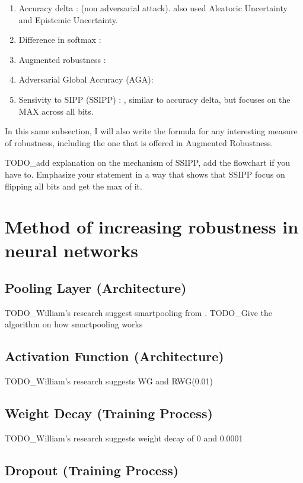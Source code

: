 \documentclass[ %
                    author={Revalda Putawara},
                supervisor={Dr. James Pope},
                    degree={MSc},
                     title={Robustness of Bayesian Neural Networks Design Choices Against Weight and Bias Perturbation Induced by Single Event Upsets (SEUs)},
                      type={},
                      year={2025}]{dissertation}
\begin{document}
\begin{enumerate}
\item Accuracy delta : \cite{dennispoperobustcnn} (non adversarial attack). \cite{zhang2021a} also used Aleatoric Uncertainty and Epistemic Uncertainty.
\item Difference in softmax : \cite{carbone2020a}
\item Augmented robustness : \cite{essbai2024a}
\item Adversarial Global Accuracy (AGA): \cite{Blaas2021}
\item Sensivity to SIPP (SSIPP) : \cite{yan_2020a}, similar to accuracy delta, but focuses on the MAX across all bits.
\end{enumerate}

In this same subsection, I will also write the formula for any interesting measure of robustness, including the one that is offered in Augmented Robustness.

TODO\_add explanation on the mechanism of SSIPP, add the flowchart if you have to. Emphasize your statement in a way that shows that SSIPP focus on flipping all bits and get the max of it.
\fi


\iffalse
\section{Method of increasing robustness in neural networks}

\subsection{Pooling Layer (Architecture)}

TODO\_William's research suggest smartpooling from \cite{santos_2019a}. 
TODO\_Give the algorithm on how smartpooling works

\subsection{Activation Function (Architecture)}

TODO\_William's research suggests WG and RWG(0.01)

\subsection{Weight Decay (Training Process)}

TODO\_William's research suggests weight decay of 0 and 0.0001

\subsection{Dropout (Training Process)}
\end{document}
